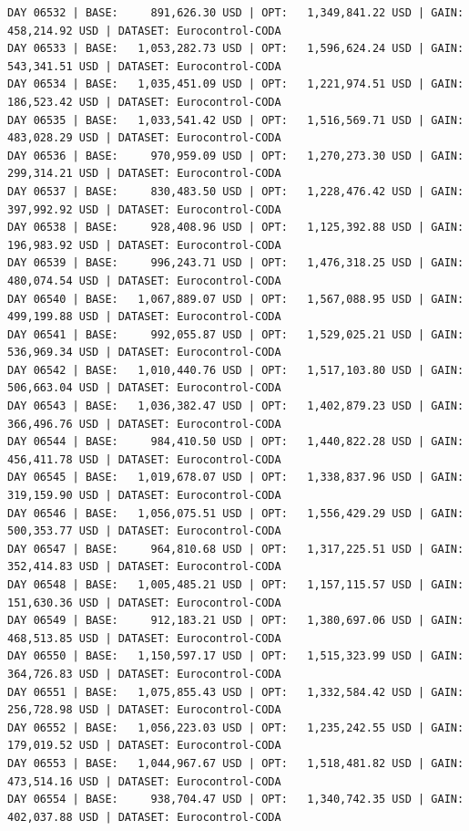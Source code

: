 \documentclass[11pt,a4paper]{article}
\begin{document}
\begin{verbatim}
DAY 06532 | BASE:     891,626.30 USD | OPT:   1,349,841.22 USD | GAIN: 458,214.92 USD | DATASET: Eurocontrol-CODA
DAY 06533 | BASE:   1,053,282.73 USD | OPT:   1,596,624.24 USD | GAIN: 543,341.51 USD | DATASET: Eurocontrol-CODA
DAY 06534 | BASE:   1,035,451.09 USD | OPT:   1,221,974.51 USD | GAIN: 186,523.42 USD | DATASET: Eurocontrol-CODA
DAY 06535 | BASE:   1,033,541.42 USD | OPT:   1,516,569.71 USD | GAIN: 483,028.29 USD | DATASET: Eurocontrol-CODA
DAY 06536 | BASE:     970,959.09 USD | OPT:   1,270,273.30 USD | GAIN: 299,314.21 USD | DATASET: Eurocontrol-CODA
DAY 06537 | BASE:     830,483.50 USD | OPT:   1,228,476.42 USD | GAIN: 397,992.92 USD | DATASET: Eurocontrol-CODA
DAY 06538 | BASE:     928,408.96 USD | OPT:   1,125,392.88 USD | GAIN: 196,983.92 USD | DATASET: Eurocontrol-CODA
DAY 06539 | BASE:     996,243.71 USD | OPT:   1,476,318.25 USD | GAIN: 480,074.54 USD | DATASET: Eurocontrol-CODA
DAY 06540 | BASE:   1,067,889.07 USD | OPT:   1,567,088.95 USD | GAIN: 499,199.88 USD | DATASET: Eurocontrol-CODA
DAY 06541 | BASE:     992,055.87 USD | OPT:   1,529,025.21 USD | GAIN: 536,969.34 USD | DATASET: Eurocontrol-CODA
DAY 06542 | BASE:   1,010,440.76 USD | OPT:   1,517,103.80 USD | GAIN: 506,663.04 USD | DATASET: Eurocontrol-CODA
DAY 06543 | BASE:   1,036,382.47 USD | OPT:   1,402,879.23 USD | GAIN: 366,496.76 USD | DATASET: Eurocontrol-CODA
DAY 06544 | BASE:     984,410.50 USD | OPT:   1,440,822.28 USD | GAIN: 456,411.78 USD | DATASET: Eurocontrol-CODA
DAY 06545 | BASE:   1,019,678.07 USD | OPT:   1,338,837.96 USD | GAIN: 319,159.90 USD | DATASET: Eurocontrol-CODA
DAY 06546 | BASE:   1,056,075.51 USD | OPT:   1,556,429.29 USD | GAIN: 500,353.77 USD | DATASET: Eurocontrol-CODA
DAY 06547 | BASE:     964,810.68 USD | OPT:   1,317,225.51 USD | GAIN: 352,414.83 USD | DATASET: Eurocontrol-CODA
DAY 06548 | BASE:   1,005,485.21 USD | OPT:   1,157,115.57 USD | GAIN: 151,630.36 USD | DATASET: Eurocontrol-CODA
DAY 06549 | BASE:     912,183.21 USD | OPT:   1,380,697.06 USD | GAIN: 468,513.85 USD | DATASET: Eurocontrol-CODA
DAY 06550 | BASE:   1,150,597.17 USD | OPT:   1,515,323.99 USD | GAIN: 364,726.83 USD | DATASET: Eurocontrol-CODA
DAY 06551 | BASE:   1,075,855.43 USD | OPT:   1,332,584.42 USD | GAIN: 256,728.98 USD | DATASET: Eurocontrol-CODA
DAY 06552 | BASE:   1,056,223.03 USD | OPT:   1,235,242.55 USD | GAIN: 179,019.52 USD | DATASET: Eurocontrol-CODA
DAY 06553 | BASE:   1,044,967.67 USD | OPT:   1,518,481.82 USD | GAIN: 473,514.16 USD | DATASET: Eurocontrol-CODA
DAY 06554 | BASE:     938,704.47 USD | OPT:   1,340,742.35 USD | GAIN: 402,037.88 USD | DATASET: Eurocontrol-CODA

\end{verbatim}
\end{document}
